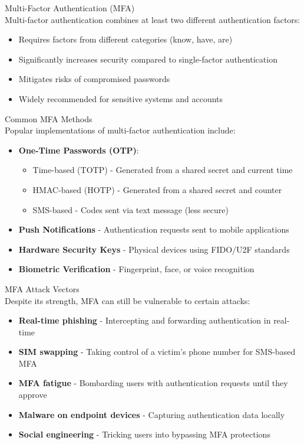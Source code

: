 \begin{definition}{Multi-Factor Authentication (MFA)}\\
Multi-factor authentication combines at least two different authentication factors:
\begin{itemize}
    \item Requires factors from different categories (know, have, are)
    \item Significantly increases security compared to single-factor authentication
    \item Mitigates risks of compromised passwords
    \item Widely recommended for sensitive systems and accounts
\end{itemize}
\end{definition}

\begin{concept}{Common MFA Methods}\\
Popular implementations of multi-factor authentication include:
\begin{itemize}
    \item \textbf{One-Time Passwords (OTP)}:
    \begin{itemize}
        \item Time-based (TOTP) - Generated from a shared secret and current time
        \item HMAC-based (HOTP) - Generated from a shared secret and counter
        \item SMS-based - Codes sent via text message (less secure)
    \end{itemize}
    \item \textbf{Push Notifications} - Authentication requests sent to mobile applications
    \item \textbf{Hardware Security Keys} - Physical devices using FIDO/U2F standards
    \item \textbf{Biometric Verification} - Fingerprint, face, or voice recognition
\end{itemize}
\end{concept}

\begin{theorem}{MFA Attack Vectors}\\
Despite its strength, MFA can still be vulnerable to certain attacks:
\begin{itemize}
    \item \textbf{Real-time phishing} - Intercepting and forwarding authentication in real-time
    \item \textbf{SIM swapping} - Taking control of a victim's phone number for SMS-based MFA
    \item \textbf{MFA fatigue} - Bombarding users with authentication requests until they approve
    \item \textbf{Malware on endpoint devices} - Capturing authentication data locally
    \item \textbf{Social engineering} - Tricking users into bypassing MFA protections
\end{itemize}
\end{theorem}

